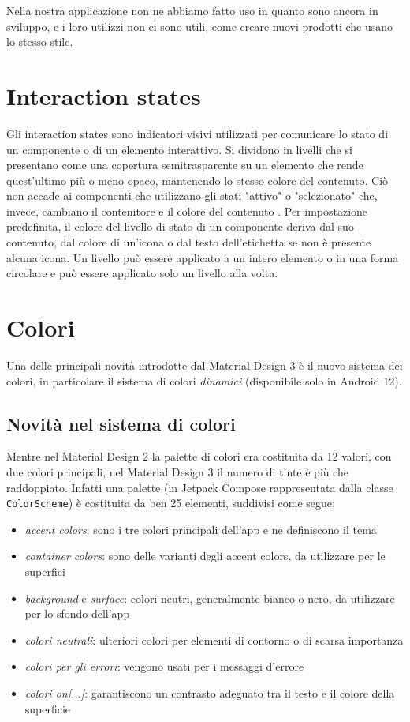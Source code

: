 \documentclass[12pt, a4paper]{report}
\begin{document}
		Nella nostra applicazione non ne abbiamo fatto uso in quanto sono ancora in sviluppo, e i loro utilizzi non ci sono utili, come creare nuovi prodotti che usano lo stesso stile.

	\section{Interaction states}
	Gli interaction states sono indicatori visivi utilizzati per comunicare lo stato di un componente o di un elemento interattivo. Si dividono in livelli che si presentano come una  copertura semitrasparente su un elemento che rende quest'ultimo più o meno opaco, mantenendo lo stesso colore del contenuto.
	Ciò non accade ai componenti che utilizzano gli stati "attivo" o "selezionato" che, invece, cambiano il contenitore e il colore del contenuto .
	Per impostazione predefinita, il colore del livello di stato di un componente deriva dal suo contenuto, dal colore di un'icona o dal testo dell'etichetta se non è presente alcuna icona.
	Un livello può essere applicato a un intero elemento o in una forma circolare e può essere applicato solo un livello alla volta.
	
	\section{Colori}
	Una delle principali novità introdotte dal Material Design 3 è il nuovo sistema dei colori, in particolare il sistema di colori \textit{dinamici} (disponibile solo in Android 12).
		
		\subsection{Novità nel sistema di colori}
		Mentre nel Material Design 2 la palette di colori era costituita da 12 valori, con due colori principali, nel Material Design 3 il numero di tinte è più che raddoppiato. Infatti una palette (in Jetpack Compose rappresentata dalla classe \texttt{ColorScheme}) è costituita da ben 25 elementi, suddivisi come segue:
		\begin{itemize}
			\item \textit{accent colors}: sono i tre colori principali dell'app e ne definiscono il tema
			\item \textit{container colors}: sono delle varianti degli accent colors, da utilizzare per le superfici
			\item \textit{background} e \textit{surface}: colori neutri, generalmente bianco o nero, da utilizzare per lo sfondo dell'app
			\item \textit{colori neutrali}: ulteriori colori per elementi di contorno o di scarsa importanza
			\item \textit{colori per gli errori}: vengono usati per i messaggi d'errore
			\item \textit{colori on[...]}: garantiscono un contrasto adeguato tra il testo e il colore della superficie
		\end{itemize}
		
\end{document}
